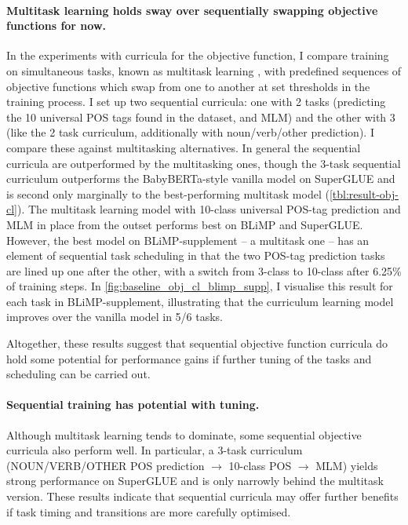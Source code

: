 \paragraph{Multitask learning holds sway over sequentially swapping objective functions for now.}
In the experiments with curricula for the objective function, I compare training on simultaneous tasks, known as multitask learning \citep{caruana1997multitask}, with predefined sequences of objective functions which swap from one to another at set thresholds in the training process. I set up two sequential curricula: one with 2 tasks (predicting the 10 universal POS tags found in the dataset, and MLM) and the other with 3 (like the 2 task curriculum, additionally with noun/verb/other prediction). I compare these against multitasking alternatives. In general the sequential curricula are outperformed by the multitasking ones, though the 3-task sequential curriculum outperforms the BabyBERTa-style vanilla model on SuperGLUE and is second only marginally to the best-performing multitask model (\cref{tbl:result-obj-cl}). The multitask learning model with 10-class universal POS-tag prediction and MLM in place from the outset performs best on BLiMP and SuperGLUE. However, the best model on BLiMP-supplement -- a multitask one -- has an element of sequential task scheduling in that the two POS-tag prediction tasks are lined up one after the other, with a switch from 3-class to 10-class after 6.25\% of training steps. In \cref{fig:baseline_obj_cl_blimp_supp}, I visualise this result for each task in BLiMP-supplement, illustrating that the curriculum learning model improves over the vanilla model in 5/6 tasks.

Altogether, these results suggest that sequential objective function curricula do hold some potential for performance gains if further tuning of the tasks and scheduling can be carried out.

\paragraph{Sequential training has potential with tuning.}
Although multitask learning tends to dominate, some sequential objective curricula also perform well. In particular, a 3-task curriculum (NOUN/VERB/OTHER POS prediction $\rightarrow$ 10-class POS $\rightarrow$ MLM) yields strong performance on SuperGLUE and is only narrowly behind the multitask version. These results indicate that sequential curricula may offer further benefits if task timing and transitions are more carefully optimised.

